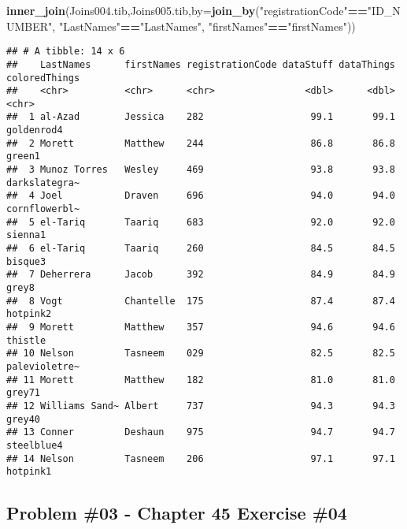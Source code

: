 \documentclass[
]{article}
\newenvironment{Shaded}{\begin{snugshade}}{\end{snugshade}}
\newcommand{\AttributeTok}[1]{\textcolor[rgb]{0.13,0.29,0.53}{#1}}
\newcommand{\FunctionTok}[1]{\textcolor[rgb]{0.13,0.29,0.53}{\textbf{#1}}}
\newcommand{\NormalTok}[1]{#1}
\newcommand{\SpecialCharTok}[1]{\textcolor[rgb]{0.81,0.36,0.00}{\textbf{#1}}}
\newcommand{\StringTok}[1]{\textcolor[rgb]{0.31,0.60,0.02}{#1}}
\begin{document}
\begin{Shaded}
\begin{Highlighting}[]
\FunctionTok{inner\_join}\NormalTok{(Joins004.tib,Joins005.tib,}\AttributeTok{by=}\FunctionTok{join\_by}\NormalTok{(}\StringTok{"registrationCode"}\SpecialCharTok{==}\StringTok{"ID\_NUMBER"}\NormalTok{,}
                                                \StringTok{"LastNames"}\SpecialCharTok{==}\StringTok{"LastNames"}\NormalTok{,}
                                                \StringTok{"firstNames"}\SpecialCharTok{==}\StringTok{"firstNames"}\NormalTok{))}
\end{Highlighting}
\end{Shaded}

\begin{verbatim}
## # A tibble: 14 x 6
##    LastNames      firstNames registrationCode dataStuff dataThings coloredThings
##    <chr>          <chr>      <chr>                <dbl>      <dbl> <chr>        
##  1 al-Azad        Jessica    282                   99.1       99.1 goldenrod4   
##  2 Morett         Matthew    244                   86.8       86.8 green1       
##  3 Munoz Torres   Wesley     469                   93.8       93.8 darkslategra~
##  4 Joel           Draven     696                   94.0       94.0 cornflowerbl~
##  5 el-Tariq       Taariq     683                   92.0       92.0 sienna1      
##  6 el-Tariq       Taariq     260                   84.5       84.5 bisque3      
##  7 Deherrera      Jacob      392                   84.9       84.9 grey8        
##  8 Vogt           Chantelle  175                   87.4       87.4 hotpink2     
##  9 Morett         Matthew    357                   94.6       94.6 thistle      
## 10 Nelson         Tasneem    029                   82.5       82.5 palevioletre~
## 11 Morett         Matthew    182                   81.0       81.0 grey71       
## 12 Williams Sand~ Albert     737                   94.3       94.3 grey40       
## 13 Conner         Deshaun    975                   94.7       94.7 steelblue4   
## 14 Nelson         Tasneem    206                   97.1       97.1 hotpink1
\end{verbatim}

\newpage

\hypertarget{problem-03---chapter-45-exercise-04}{%
\subsection{Problem \#03 - Chapter 45 Exercise
\#04}\label{problem-03---chapter-45-exercise-04}}
\end{document}
